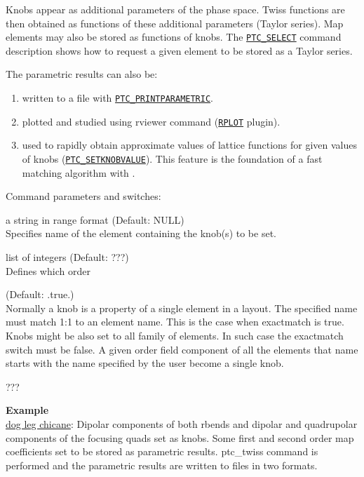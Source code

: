 Knobs appear as additional parameters of the phase space. Twiss
functions are then obtained as functions of these additional parameters
(Taylor series).
Map elements may also be stored as functions of knobs.
The \hyperref[sec:ptc-select]{\texttt{PTC\_SELECT}} command
description shows how to request a given element to be stored as a
Taylor series.

The parametric results can also be:
\begin{enumerate}
   \item  written to a file with
     \hyperref[sec:ptc-printparametric]{\texttt{PTC\_PRINTPARAMETRIC}}.
   \item  plotted and studied using rviewer command
     (\hyperref[sec:rplot]{\texttt{RPLOT}} plugin).
   \item  used to rapidly obtain approximate values of lattice
     functions for given values of knobs
     (\hyperref[sec:ptc-setknobvalue]{\texttt{PTC\_SETKNOBVALUE}}). This
     feature is the foundation of a fast matching algorithm with \ptc.
\end{enumerate}


Command parameters and switches:
\begin{madlist}
    a string in range format (Default: NULL)\\
     Specifies name of the element containing the knob(s) to be set.

    list of integers (Default: ???)\\
     Defines which order

    (Default: .true.)\\
     Normally a knob is a property of a single element in a layout.
     The specified name must match 1:1 to an element name. This is the
     case when exactmatch is true.\\
     Knobs might be also set to all family of elements. In such case
     the exactmatch switch must be false. A given order field
     component of all the elements that name starts with the
     name specified by the user become a single knob.

    ???
\end{madlist}


\textbf{Example}\\
\href{http://cern.ch/frs/mad-X_examples/ptc_madx_interface/knobs/knobs.madx}{dog
leg chicane}: Dipolar components of both rbends and dipolar and
quadrupolar components of the focusing quads set as knobs. Some first
and second order map coefficients set to be stored as parametric
results. ptc\_twiss command is performed and the parametric results are
written to files in two formats.


